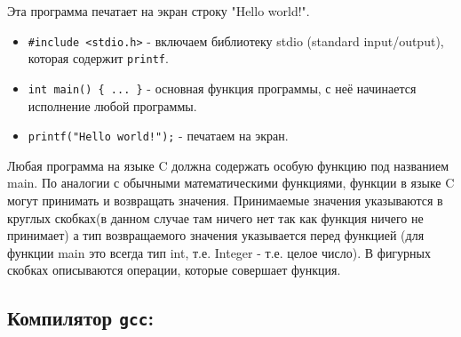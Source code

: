 \documentclass{article}
\begin{document}
Эта программа печатает на экран строку "Hello world!".
\begin{itemize}
\item \texttt{\#include <stdio.h>}  - включаем библиотеку stdio (standard input/output), которая содержит \texttt{printf}.
\item \texttt{int main() \{ ... \}} - основная функция программы, с неё начинается исполнение любой программы.
\item \texttt{printf("Hello world!");} - печатаем на экран.
\end{itemize}

Любая программа на языке C должна содержать особую функцию под названием main. По аналогии с обычными математическими функциями, функции в языке C могут принимать и возвращать значения. Принимаемые значения указываются в круглых скобках(в данном случае там ничего нет так как функция ничего не принимает) а тип возвращаемого значения указывается перед функцией (для функции main это всегда тип int, т.е. Integer - т.е. целое число). В фигурных скобках описываются операции, которые совершает функция. 
\subsection*{Компилятор \texttt{gcc}:}
\end{document}
